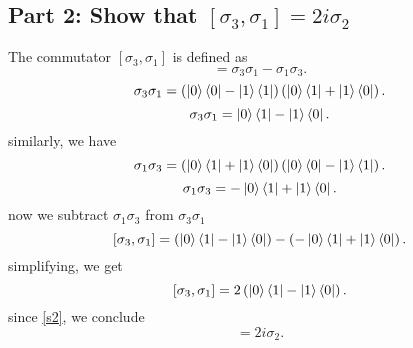 \documentclass[12pt]{article}
\begin{document}
\subsection*{Part 2: Show that \( [ \sigma_3, \sigma_1 ] = 2i \sigma_2 \)}
The commutator \( [ \sigma_3, \sigma_1 ] \) is defined as
\begin{equation}
    [ \sigma_3, \sigma_1 ] = \sigma_3 \sigma_1 - \sigma_1 \sigma_3.    
\end{equation}
\[
\sigma_3 \sigma_1 = \left( \ket{0}\bra{0} - \ket{1}\bra{1} \right) \left( \ket{0}\bra{1} + \ket{1}\bra{0} \right).
\]
\[
\sigma_3 \sigma_1 = \ket{0}\bra{1} - \ket{1}\bra{0}.
\]
similarly, we have
\[
\sigma_1 \sigma_3 = \left( \ket{0}\bra{1} + \ket{1}\bra{0} \right) \left( \ket{0}\bra{0} - \ket{1}\bra{1} \right).
\]
\[
\sigma_1 \sigma_3 = - \ket{0}\bra{1} + \ket{1}\bra{0}.
\]
now we subtract \(\sigma_1 \sigma_3\) from \(\sigma_3 \sigma_1\)
\[
[ \sigma_3, \sigma_1 ] = \left( \ket{0}\bra{1} - \ket{1}\bra{0} \right) - \left( - \ket{0}\bra{1} + \ket{1}\bra{0} \right).
\]
simplifying, we get
\[
[ \sigma_3, \sigma_1 ] = 2 \left( \ket{0}\bra{1} - \ket{1}\bra{0} \right).
\]
since \ref{s2}, we conclude
\begin{equation}
[ \sigma_3, \sigma_1 ] = 2i \sigma_2.
\end{equation}
\end{document}
